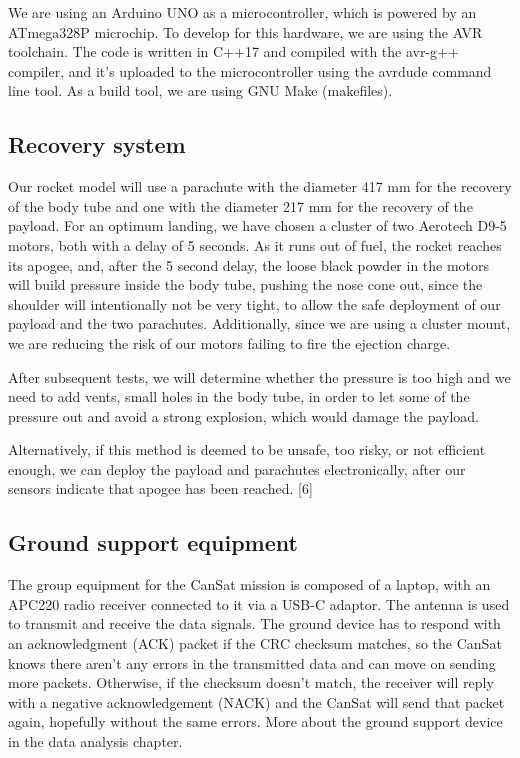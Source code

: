 We are using an Arduino UNO as a microcontroller, which is powered by an ATmega328P microchip. To develop for this hardware, we are using the AVR toolchain. The code is written in C++17 and compiled with the avr-g++ compiler, and it's uploaded to the microcontroller using the avrdude command line tool. As a build tool, we are using GNU Make (makefiles).

\subsection{Recovery system}

Our rocket model will use a parachute with the diameter 417 mm for the recovery of the body tube and one with the diameter 217 mm for the recovery of the payload. For an optimum landing, we have chosen a cluster of two Aerotech D9-5 motors, both with a delay of 5 seconds. As it runs out of fuel, the rocket reaches its apogee, and, after the 5 second delay, the loose black powder in the motors will build pressure inside the body tube, pushing the nose cone out, since the shoulder will intentionally not be very tight, to allow the safe deployment of our payload and the two parachutes. Additionally, since we are using a cluster mount, we are reducing the risk of our motors failing to fire the ejection charge.

After subsequent tests, we will determine whether the pressure is too high and we need to add vents, small holes in the body tube, in order to let some of the pressure out and avoid a strong explosion, which would damage the payload.

Alternatively, if this method is deemed to be unsafe, too risky, or not efficient enough, we can deploy the payload and parachutes electronically, after our sensors indicate that apogee has been reached. [6]

\subsection{Ground support equipment}

The group equipment for the CanSat mission is composed of a laptop, with an APC220 radio receiver connected to it via a USB-C adaptor. The antenna is used to transmit and receive the data signals. The ground device has to respond with an acknowledgment (ACK) packet if the CRC checksum matches, so the CanSat knows there aren’t any errors in the transmitted data and can move on sending more packets. Otherwise, if the checksum doesn’t match, the receiver will reply with a negative acknowledgement (NACK) and the CanSat will send that packet again, hopefully without the same errors. More about the ground support device in the data analysis chapter. 
